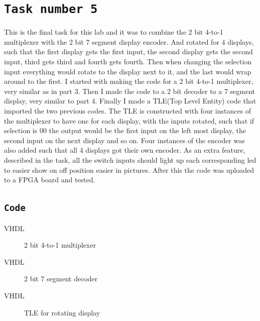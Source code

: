 \documentclass{article}
\let\oldsection\section
\renewcommand{\section}[1]{%
  \oldsection{\texttt{#1}} %
  \setcounter{subsection}{-1} %
  \setcounter{figure}{-1} %
}
\let\oldsubsection\subsection
\renewcommand{\subsection}[1]{%
  \oldsubsection{\texttt{#1}}%
  \setcounter{subsubsection}{-1}%
}
\newcommand{\writecode}[3][Example Code]{%
    \begin{codeBlock}{#1}%
    \end{codeBlock}%
    \begin{figure}[h] %
        \centering
        \renewcommand\figurename{Code}
        \caption{#3} %
        \label{Code:#2} %
    \end{figure}
}
\begin{document}
\section{Task number 5}
This is the final task for this lab and it was to combine the 2 bit 4-to-1 multiplexer with the 2 bit 7 segment display encoder. And rotated for 4 displays, such that the first display gets the first input, the second display gets the second input, third gets third and fourth gets fourth. Then when changing the selection input everything would rotate to the display next to it, and the last would wrap around to the first. I started with making the code for a 2 bit 4-to-1 multiplexer, very similar as in part 3. Then I made the code to a 2 bit decoder to a 7 segment display, very similar to part 4. Finally I made a TLE(Top Level Entity) code that imported the two previous codes. The TLE is constructed with four instances of the multiplexer to have one for each display, with the inputs rotated, such that if selection is 00 the output would be the first input on the left most display, the second input on the next display and so on. Four instances of the encoder was also added such that all 4 displays got their own encoder. As an extra feature, described in the task, all the switch inputs should light up each corresponding led to easier show on off position easier in pictures. After this the code was uploaded to a FPGA board and tested.

\subsection{Code}
\writecode[VHDL]{Part5_Code_mux.vhd}{2 bit 4-to-1 multiplexer}
\clearpage
\writecode[VHDL]{Part5_Code_decoder.vhd}{2 bit 7 segment decoder}
\clearpage
\writecode[VHDL]{Part5_Code_TLE.vhd}{TLE for rotating display}
\clearpage
\end{document}
